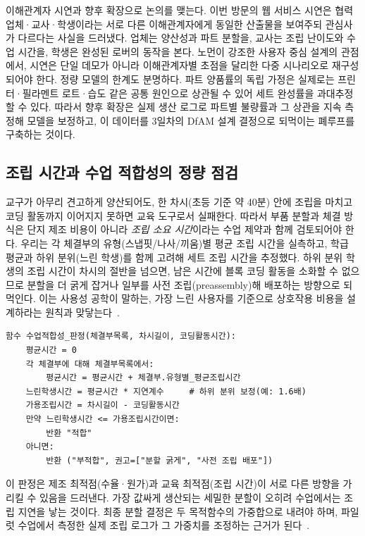 이해관계자 시연과 향후 확장으로 논의를 맺는다. 이번 방문의 웹 서비스 시연은 협력 업체·교사·학생이라는 서로 다른 이해관계자에게 동일한 산출물을 보여주되 관심사가 다르다는 사실을 드러냈다. 업체는 양산성과 파트 분할을, 교사는 조립 난이도와 수업 시간을, 학생은 완성된 로버의 동작을 본다. 노먼이 강조한 사용자 중심 설계\cite{norman2013design}의 관점에서, 시연은 단일 데모가 아니라 이해관계자별 초점을 달리한 다중 시나리오로 재구성되어야 한다. 정량 모델의 한계도 분명하다. 파트 양품률의 독립 가정은 실제로는 프린터·필라멘트 로트·습도 같은 공통 원인으로 상관될 수 있어 세트 완성률을 과대추정할 수 있다. 따라서 향후 확장은 실제 생산 로그로 파트별 불량률과 그 상관을 지속 측정해 모델을 보정하고, 이 데이터를 3일차의 DfAM 설계 결정으로 되먹이는 폐루프를 구축하는 것이다.



\subsection{조립 시간과 수업 적합성의 정량 점검}
교구가 아무리 견고하게 양산되어도, 한 차시(초등 기준 약 40분) 안에 조립을 마치고 코딩
활동까지 이어지지 못하면 교육 도구로서 실패한다. 따라서 부품 분할과 체결 방식은 단지
제조 비용이 아니라 \emph{조립 소요 시간}이라는 수업 제약과 함께 검토되어야 한다. 우리는
각 체결부의 유형(스냅핏/나사/끼움)별 평균 조립 시간을 실측하고, 학급 평균과 하위
분위(느린 학생)를 함께 고려해 세트 조립 시간을 추정했다. 하위 분위 학생의 조립 시간이
차시의 절반을 넘으면, 남은 시간에 블록 코딩 활동을 소화할 수 없으므로 분할을 더 굵게
잡거나 일부를 사전 조립(preassembly)해 배포하는 방향으로 되먹인다. 이는 사용성 공학이
말하는, 가장 느린 사용자를 기준으로 상호작용 비용을 설계하라는 원칙과 맞닿는다~\cite{krug2014dontmakemethink, norman2013design}.

\begin{verbatim}
함수 수업적합성_판정(체결부목록, 차시길이, 코딩활동시간):
    평균시간 = 0
    각 체결부에 대해 체결부목록에서:
        평균시간 = 평균시간 + 체결부.유형별_평균조립시간
    느린학생시간 = 평균시간 * 지연계수     # 하위 분위 보정(예: 1.6배)
    가용조립시간 = 차시길이 - 코딩활동시간
    만약 느린학생시간 <= 가용조립시간이면:
        반환 "적합"
    아니면:
        반환 ("부적합", 권고=["분할 굵게", "사전 조립 배포"])
\end{verbatim}

이 판정은 제조 최적점(수율·원가)과 교육 최적점(조립 시간)이 서로 다른 방향을 가리킬 수
있음을 드러낸다. 가장 값싸게 생산되는 세밀한 분할이 오히려 수업에서는 조립 지연을
낳는 것이다. 최종 분할 결정은 두 목적함수의 가중합으로 내려야 하며, 파일럿 수업에서
측정한 실제 조립 로그가 그 가중치를 조정하는 근거가 된다~\cite{iso25010}.


